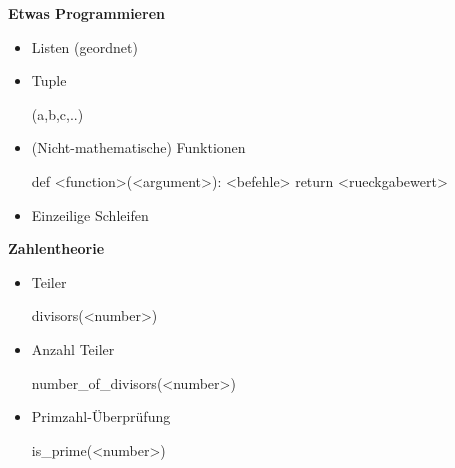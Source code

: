 \documentclass[a4paper,9pt,DIV15,twocolumn]{scrartcl}
\begin{document}
\textbf{Etwas Programmieren}
\begin{itemize}
    \item Listen (geordnet)
        \begin{sagein}
[a,b,c,..]
        \end{sagein}
    \item Tuple
        \begin{sagein}
(a,b,c,..)
        \end{sagein}
    \item (Nicht-mathematische) Funktionen
\begin{sagein}
def <function>(<argument>): <befehle> return <rueckgabewert>
\end{sagein}
    \item Einzeilige Schleifen
\begin{sagein}
\end{sagein}
\end{itemize}

\textbf{Zahlentheorie}
\begin{itemize}
    \item Teiler 
\begin{sagein}
divisors(<number>)
\end{sagein}
\item Anzahl Teiler
\begin{sagein}
number_of_divisors(<number>)
\end{sagein}
    \item Primzahl-Überprüfung 
\begin{sagein} 
is_prime(<number>)
\end{sagein}
\end{itemize}
\end{document}
